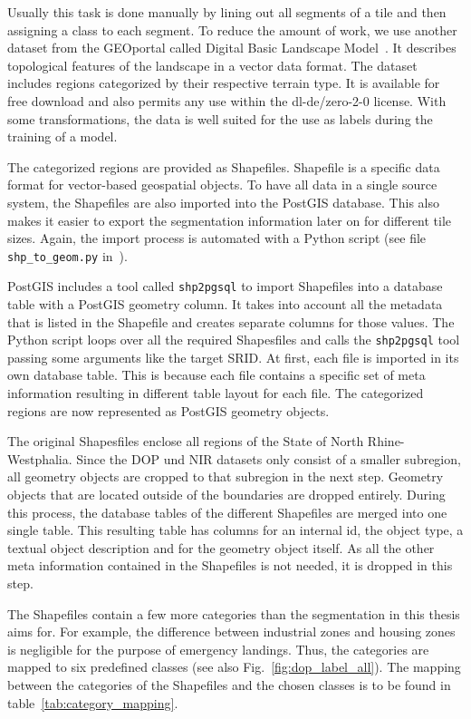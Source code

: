 Usually this task is done manually by lining out all segments of a tile and then assigning a class to each segment. To reduce the amount of work, we use another dataset from the GEOportal called Digital Basic Landscape Model~\cite{base-dlm20}. It describes topological features of the landscape in a vector data format. The dataset includes regions categorized by their respective terrain type. It is available for free download and also permits any use within the dl-de/zero-2-0 license. With some transformations, the data is well suited for the use as labels during the training of a model.

The categorized regions are provided as Shapefiles. Shapefile is a specific data format for vector-based geospatial objects. To have all data in a single source system, the Shapefiles are also imported into the PostGIS database. This also makes it easier to export the segmentation information later on for different tile sizes. Again, the import process is automated with a Python script (see file \texttt{shp\_to\_geom.py} in~\cite{thesis-code20}).

PostGIS includes a tool called \texttt{shp2pgsql} to import Shapefiles into a database table with a PostGIS geometry column. It takes into account all the metadata that is listed in the Shapefile and creates separate columns for those values. The Python script loops over all the required Shapesfiles and calls the \texttt{shp2pgsql} tool passing some arguments like the target SRID. At first, each file is imported in its own database table. This is because each file contains a specific set of meta information resulting in different table layout for each file. The categorized regions are now represented as PostGIS geometry objects.

The original Shapesfiles enclose all regions of the State of North Rhine-Westphalia. Since the DOP und NIR datasets only consist of a smaller subregion, all geometry objects are cropped to that subregion in the next step. Geometry objects that are located outside of the boundaries are dropped entirely. During this process, the database tables of the different Shapefiles are merged into one single table. This resulting table has columns for an internal id, the object type, a textual object description and for the geometry object itself. As all the other meta information contained in the Shapefiles is not needed, it is dropped in this step.
\clearpage

The Shapefiles contain a few more categories than the segmentation in this thesis aims for. For example, the difference between industrial zones and housing zones is negligible for the purpose of emergency landings. Thus, the categories are mapped to six predefined classes (see also Fig.~\ref{fig:dop_label_all}). The mapping between the categories of the Shapefiles and the chosen classes is to be found in table~\ref{tab:category_mapping}.


